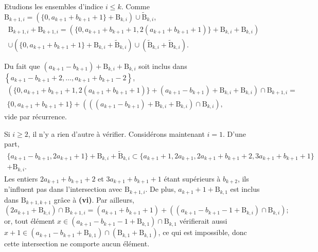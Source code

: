 \documentclass[11pt, oneside]{article}   	%
\newcommand{\interval}[2]{\left\{ #1, \dots, #2 \right\}}
\begin{document}
Etudions les ensembles d'indice $i \leqslant k$.
Comme $\mathrm{B}_{k + 1, i} = (\{ 0, a_{k+1} + b_{k+1} + 1 \} + \mathrm{B}_{k, i}) \cup \widetilde{\mathrm{B}}_{k, i}$,
\begin{multline}
 \mathrm{B}_{k + 1, i} + \mathrm{B}_{k + 1, i} = (\{ 0, a_{k+1} + b_{k+1} + 1, 2 (a_{k+1} + b_{k+1} + 1) \} + \mathrm{B}_{k, i} + \mathrm{B}_{k, i}) \\
 \cup (\{ 0, a_{k+1} + b_{k+1} + 1 \} + \mathrm{B}_{k, i} + \widetilde{\mathrm{B}}_{k, i}) \cup (\widetilde{\mathrm{B}}_{k, i} + \widetilde{\mathrm{B}}_{k, i}).
\end{multline}

Du fait que $(a_{k+1} - b_{k+1}) + \mathrm{B}_{k, i} + \mathrm{B}_{k, i}$ soit inclus dans $\interval{a_{k+1} - b_{k+1} + 2}{a_{k+1} + b_{k+1} - 2}$,
\begin{multline}
 (\{ 0, a_{k+1} + b_{k+1} + 1, 2 (a_{k+1} + b_{k+1} + 1) \} + (a_{k+1} - b_{k+1}) + \mathrm{B}_{k, i} + \mathrm{B}_{k, i}) \cap \mathrm{B}_{k + 1, i} = \\
 \{ 0, a_{k+1} + b_{k+1} + 1 \} + (((a_{k+1} - b_{k+1}) + \mathrm{B}_{k, i} + \mathrm{B}_{k, i}) \cap \mathrm{B}_{k, i}),
\end{multline}
vide par récurrence.

Si $i \geqslant 2$, il n'y a rien d'autre à vérifier. Considérons maintenant $i = 1$.
D'une part,
\begin{multline}
 \{ a_{k+1} - b_{k+1}, 2 a_{k+1} + 1 \} + \mathrm{B}_{k, i} + \widetilde{\mathrm{B}}_{k, i} \subset \{ a_{k+1} + 1, 2 a_{k+1}, 2 a_{k+1} + b_{k+1} + 2, 3 a_{k+1} + b_{k+1} + 1 \} \\
 + \mathrm{B}_{k, i}.
\end{multline}
Les entiers $2 a_{k+1} + b_{k+1} + 2$ et $3 a_{k+1} + b_{k+1} + 1$ étant supérieurs à $b_{k + 2}$, ils n'influent pas dans l'intersection avec $\mathrm{B}_{k + 1, i}$.
De plus, $a_{k+1} + 1 + \mathrm{B}_{k, 1}$ est inclus dans $\mathrm{B}_{k + 1, k + 1}$ grâce à \textbf{(vi)}.
Par ailleurs,
\begin{equation}
 (2 a_{k+1} + \mathrm{B}_{k, i}) \cap \mathrm{B}_{k + 1, i} = (a_{k+1} + b_{k+1} + 1) + ((a_{k+1} - b_{k+1} - 1 + \mathrm{B}_{k, i}) \cap \mathrm{B}_{k, i});
\end{equation}
or, tout élément $x \in (a_{k+1} - b_{k+1} - 1 + \mathrm{B}_{k, 1}) \cap \mathrm{B}_{k, 1}$ vérifierait aussi
$x + 1 \in (a_{k+1} - b_{k+1} + \mathrm{B}_{k, 1}) \cap (\mathrm{B}_{k, 1} + \mathrm{B}_{k, 1})$, ce qui est impossible,
donc cette intersection ne comporte aucun élément.
\end{document}
